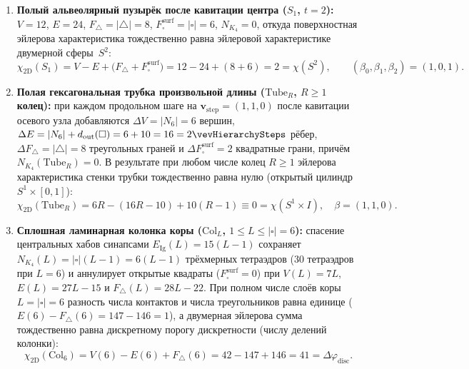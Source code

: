 \begin{theorem}
\begin{enumerate}[leftmargin=*]
  $V = 13 = N_\phi$, $E = 36 = d\,\geomNeighborTwelve$, $F_\square^{\mathrm{surf}} = 0$ и $N_{K_4} = 8 = |\triangle| > 0$, $(\beta_0,\beta_1,\beta_2) = (1,0,0)$ (стягиваемый трёхмерный шар~$B^3$).
\item \textbf{Полый альвеолярный пузырёк после кавитации центра ($S_1$, $t=2$):}
  $V = 12$, $E = 24$, $F_\triangle = |\triangle| = 8$, $F_\square^{\mathrm{surf}} = |\square| = 6$, $N_{K_4} = 0$, откуда поверхностная эйлерова характеристика тождественно равна эйлеровой характеристике двумерной сферы~$S^2$:
  \begin{equation}
  \label{eq:bio-euler-vesicle-2}
    \chi_{\mathrm{2D}}(S_1) = V - E + \bigl(F_\triangle + F_\square^{\mathrm{surf}}\bigr) = 12 - 24 + (8 + 6) = 2 = \chi(S^2),\qquad
    (\beta_0,\beta_1,\beta_2) = (1,0,1).
  \end{equation}
\item \textbf{Полая гексагональная трубка произвольной длины ($\mathrm{Tube}_R$, $R \ge 1$ колец):}
  при каждом продольном шаге на $\mathbf{v}_{\mathrm{step}}=(1,1,0)$ после кавитации осевого узла добавляются $\Delta V = |N_6| = 6$ вершин, $\Delta E = |N_6| + d_{\mathrm{out}}(\square) = 6 + 10 = 16 = 2\vevHierarchySteps$ рёбер, $\Delta F_\triangle = |\triangle| = 8$ треугольных граней и $\Delta F_\square^{\mathrm{surf}} = 2$ квадратные грани, причём $N_{K_4}(\mathrm{Tube}_R) = 0$. В результате при любом числе колец $R \ge 1$ эйлерова характеристика стенки трубки тождественно равна нулю (открытый цилиндр $S^1\times [0,1]$):
  \begin{equation}
  \label{eq:bio-euler-tube-0}
    \chi_{\mathrm{2D}}(\mathrm{Tube}_R)
    = 6R - (16R - 10) + 10(R-1)
    \equiv 0 = \chi(S^1\times I),\quad
    \beta = (1,1,0).
  \end{equation}
\item \textbf{Сплошная ламинарная колонка коры ($\mathrm{Col}_L$, $1 \le L \le |\square| = 6$):}
  спасение центральных хабов синапсами $E_{\mathrm{Ig}}(L) = 15(L-1)$ сохраняет $N_{K_4}(L) = |\square|(L-1) = 6(L-1)$ трёхмерных тетраэдров ($30$ тетраэдров при $L=6$) и аннулирует открытые квадраты ($F_\square^{\mathrm{surf}} = 0$) при $V(L) = 7L$, $E(L) = 27L - 15$ и $F_\triangle(L) = 28L - 22$. При полном числе слоёв коры $L = |\square| = 6$ разность числа контактов и числа треугольников равна единице ($E(6) - F_\triangle(6) = 147 - 146 = 1$), а двумерная эйлерова сумма тождественно равна дискретному порогу дискретности (числу делений колонки):
  \begin{equation}
  \label{eq:bio-euler-column-41}
    \chi_{\mathrm{2D}}(\mathrm{Col}_6)
    = V(6) - E(6) + F_\triangle(6)
    = 42 - 147 + 146
    = 41 = \Delta\varphi_{\mathrm{disc}}.
  \end{equation}
\end{enumerate}
\end{theorem}

